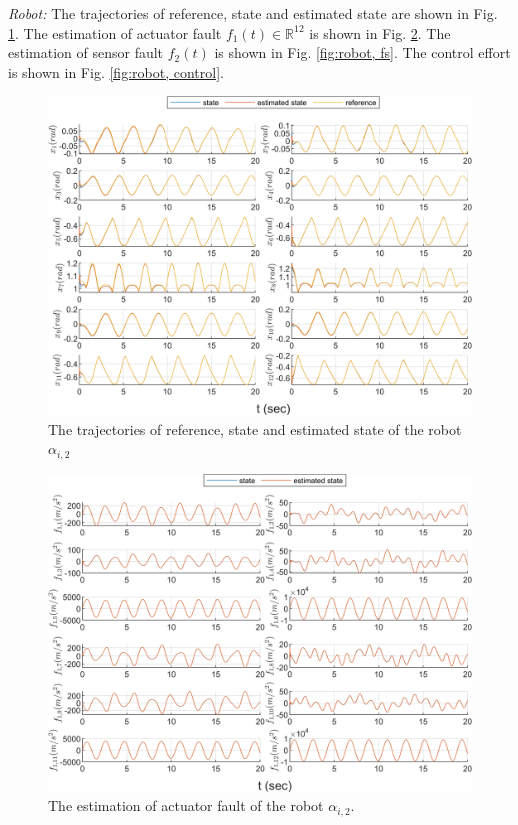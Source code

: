 \documentclass{ieeeaccess}
\begin{document}
\textit{Robot:}
The trajectories of reference, state and estimated state are shown in Fig. \ref{fig:robot, state}. The estimation of actuator fault $f_1(t)\in\mathbb{R}^{12}$ is shown in Fig. \ref{fig:robot, fa}. The estimation of sensor fault $f_2(t)$ is shown in Fig. \ref{fig:robot, fs}. The control effort is shown in Fig. \ref{fig:robot, control}.
\begin{figure}[htbp]
    \centering
    \includegraphics[scale=.57]{fig/robot (1).png}\caption{The trajectories of reference, state and estimated state of the robot $\alpha_{i,2}$}%
    \label{fig:robot, state}
\end{figure}
\begin{figure}[htbp]
    \centering
    \includegraphics[scale=.57]{fig/robot (2).png}\caption{The estimation of actuator fault of the robot $\alpha_{i,2}$.}%
    \label{fig:robot, fa}
\end{figure}
\end{document}
